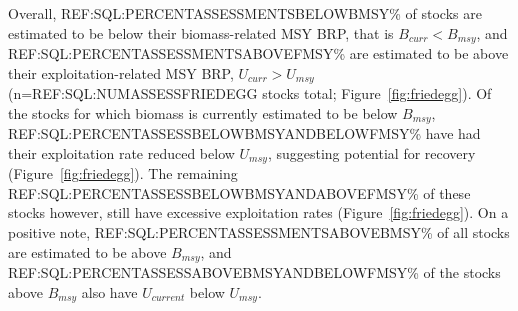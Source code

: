 

Overall, REF:SQL:PERCENTASSESSMENTSBELOWBMSY\% of stocks are estimated
to be below their biomass-related MSY BRP, that is $B_{curr}<B_{msy}$,
and REF:SQL:PERCENTASSESSMENTSABOVEFMSY\% are estimated to be above
their exploitation-related MSY BRP, $U_{curr}>U_{msy}$
(n=REF:SQL:NUMASSESSFRIEDEGG stocks total; Figure~\ref{fig:friedegg}).
Of the stocks for which biomass is currently estimated to be below
$B_{msy}$, REF:SQL:PERCENTASSESSBELOWBMSYANDBELOWFMSY\% have had their
exploitation rate reduced below $U_{msy}$, suggesting potential for
recovery (Figure~\ref{fig:friedegg}). The remaining
REF:SQL:PERCENTASSESSBELOWBMSYANDABOVEFMSY\% of these stocks however,
still have excessive exploitation rates (Figure~\ref{fig:friedegg}).
On a positive note, REF:SQL:PERCENTASSESSMENTSABOVEBMSY\% of all stocks are
estimated to be above $B_{msy}$, and
REF:SQL:PERCENTASSESSABOVEBMSYANDBELOWFMSY\% of the stocks above
$B_{msy}$ also have $U_{current}$ below $U_{msy}$.





